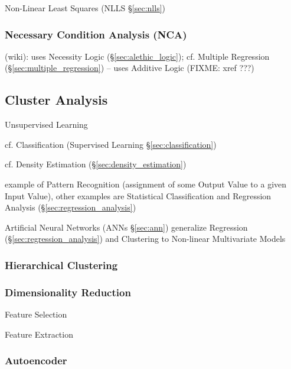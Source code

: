 Non-Linear Least Squares (NLLS \S\ref{sec:nlls})



\subsubsection{Necessary Condition Analysis (NCA)}\label{sec:nca}

(wiki): uses Necessity Logic (\S\ref{sec:alethic_logic});
cf. Multiple Regression (\S\ref{sec:multiple_regression}) -- uses Additive Logic
(FIXME: xref ???)



\subsection{Cluster Analysis}\label{sec:cluster_analysis}

Unsupervised Learning

cf. Classification (Supervised Learning \S\ref{sec:classification})

cf. Density Estimation (\S\ref{sec:density_estimation})

example of Pattern Recognition (assignment of some Output Value to a given Input
Value), other examples are Statistical Classification and Regression Analysis
(\S\ref{sec:regression_analysis})

Artificial Neural Networks (ANNs \S\ref{sec:ann}) generalize Regression
(\S\ref{sec:regression_analysis}) and Clustering to Non-linear Multivariate
Models



\subsubsection{Hierarchical Clustering}\label{sec:hierarchical_clustering}

\subsubsection{Dimensionality Reduction}\label{sec:dimensionality_reduction}

Feature Selection

Feature Extraction



\subsubsection{Autoencoder}\label{sec:autoencoder}

